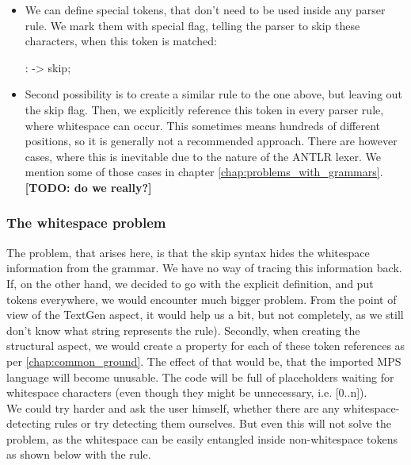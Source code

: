 \begin{itemize}
	\item We can define special tokens, that don't need to be used inside any parser rule. 
	We mark them with special flag, telling the parser to skip these characters, when this token is matched:

	\begin{antlr}
		   :     -> skip;
	\end{antlr}

	\item Second possibility is to create a similar rule to the one above, but leaving out the skip flag.
	Then, we explicitly reference this token in every parser rule, where whitespace can occur.
	This sometimes means hundreds of different positions, so it is generally not a recommended approach.
	There are however cases, where this is inevitable due to the nature of the ANTLR lexer.
	We mention some of those cases in chapter \ref{chap:problems_with_grammars}. \textbf{[TODO: do we really?]}
\end{itemize}

\subsubsection{The whitespace problem}

The problem, that arises here, is that the skip syntax hides the whitespace information from the grammar. 
We have no way of tracing this information back.
If, on the other hand, we decided to go with the explicit definition, and put  tokens everywhere, we would encounter much bigger problem.
From the point of view of the TextGen aspect, it would help us a bit, but not completely, as we still don't know what string represents the rule).
Secondly, when creating the structural aspect, we would create a property for each of these token references as per \ref{chap:common_ground}.
The effect of that would be, that the imported MPS language will become unusable.
The code will be full of placeholders waiting for whitespace characters (even though they might be unnecessary, i.e. [0..n]).
\\

We could try harder and ask the user himself, whether there are any whitespace-detecting rules or try detecting them ourselves.
But even this will not solve the problem, as the whitespace can be easily entangled inside non-whitespace tokens as shown below with the  rule.
\\

